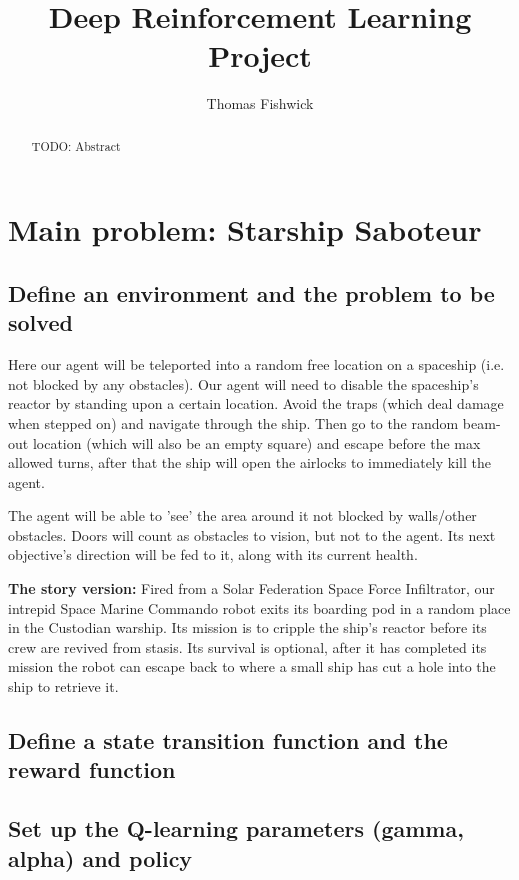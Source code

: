 \documentclass[a4pape, 11pt, english]{article}
\begin{document}
\title{Deep Reinforcement Learning Project}
\author{Thomas Fishwick}

\maketitle

\begin{abstract}
TODO: Abstract
\end{abstract}

\section{Main problem: Starship Saboteur}
\subsection{Define an environment and the problem to be solved}
Here our agent will be teleported into a random free location on a spaceship (i.e. not blocked by any obstacles). Our agent will need to disable the spaceship's reactor by standing upon a certain location. Avoid the traps (which deal damage when stepped on) and navigate through the ship. Then go to the random beam-out location (which will also be an empty square) and escape before the max allowed turns, after that the ship will open the airlocks to immediately kill the agent.

The agent will be able to 'see' the area around it not blocked by walls/other obstacles. Doors will count as obstacles to vision, but not to the agent. Its next objective's direction will be fed to it, along with its current health.

\textbf{The story version:}
Fired from a Solar Federation Space Force Infiltrator, our intrepid Space Marine Commando robot exits its boarding pod in a random place in the Custodian warship. Its mission is to cripple the ship's reactor before its crew are revived from stasis. Its survival is optional, after it has completed its mission the robot can escape back to where a small ship has cut a hole into the ship to retrieve it.

\subsection{Define a state transition function and the reward function}

\subsection{Set up the Q-learning parameters (gamma, alpha) and policy}
\end{document}
